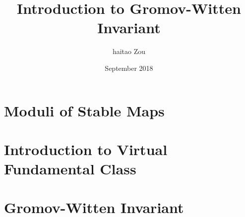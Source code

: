 \documentclass[a4paper,10pt]{article}
\title{Introduction to Gromov-Witten Invariant}
\author{haitao Zou}
\date{September 2018}
\begin{document}
\maketitle
\tableofcontents
\section{Moduli of Stable Maps}
\section{Introduction to Virtual Fundamental Class}
\section{Gromov-Witten Invariant}
\end{document}
